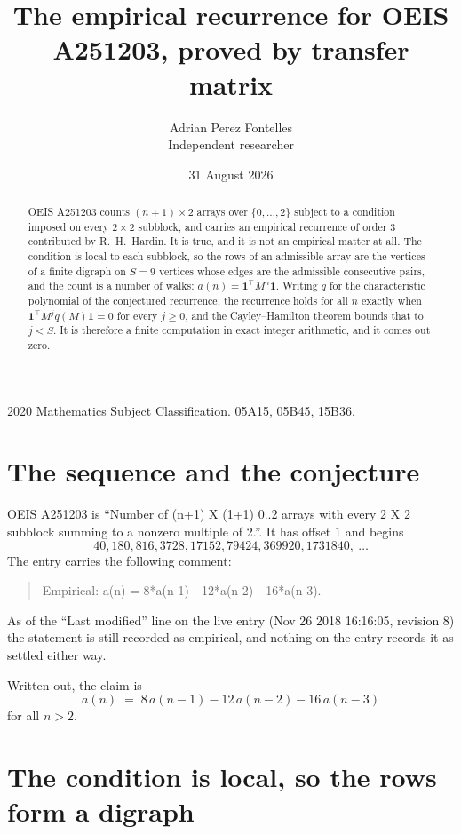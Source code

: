\documentclass[11pt,a4paper]{article}
\title{The empirical recurrence for OEIS A251203, proved by transfer matrix}
\author{Adrian Perez Fontelles\\ \small Independent researcher}
\date{31 August 2026}
\theoremstyle{plain}
\theoremstyle{definition}
\begin{document}
\maketitle

\begin{abstract}
OEIS A251203 counts $(n+1)\times2$ arrays over $\{0,\dots,2\}$ subject to a condition imposed on
every $2\times2$ subblock, and carries an empirical recurrence of order $3$ contributed
by R.~H.~Hardin. It is true, and it is not an empirical matter at all. The condition is local
to each subblock, so the rows of an admissible array are the vertices of a finite digraph
on $S=9$ vertices whose edges are the admissible consecutive pairs, and the count is a
number of walks: $a(n)=\mathbf{1}^{\!\top}M^{n}\mathbf{1}$. Writing $q$
for the characteristic polynomial of the conjectured recurrence, the recurrence holds for all
$n$ exactly when $\mathbf{1}^{\!\top}M^{j}q(M)\mathbf{1}=0$ for every $j\ge0$, and the
Cayley--Hamilton theorem bounds that to $j<S$. It is therefore a finite computation in exact
integer arithmetic, and it comes out zero.
\end{abstract}

\noindent\small 2020 Mathematics Subject Classification. 05A15, 05B45, 15B36.\normalsize

\section{The sequence and the conjecture}

OEIS A251203 is ``Number of (n+1) X (1+1) 0..2 arrays with every 2 X 2 subblock summing to a nonzero multiple of 2.''. It has offset $1$ and begins
\[
40, 180, 816, 3728, 17152, 79424, 369920, 1731840,\ \dots
\]
The entry carries the following comment:
\begin{quote}\small
Empirical: a(n) = 8*a(n-1) - 12*a(n-2) - 16*a(n-3).
\end{quote}
As of the ``Last modified'' line on the live entry (Nov 26 2018 16:16:05, revision 8) the statement is
still recorded as empirical, and nothing on the entry records it as settled either way.

Written out, the claim is
\begin{equation}\label{eq:conj}
a(n)\;=\;8\,a(n-1) - 12\,a(n-2) - 16\,a(n-3)
\end{equation}
for all $n>2$.

\section{The condition is local, so the rows form a digraph}
\end{document}

